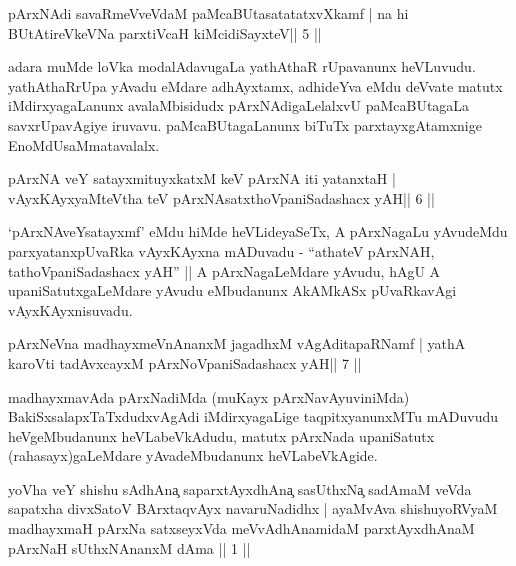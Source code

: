 \begin{shl}
pArxNAdi savaRmeVveVdaM paMcaBUtasatatatxvXkamf |
na hi BUtAtireVkeVNa parxtiVcaH kiMcidiSayxteV\hfill || 5 ||
\end{shl}

\begin{artha}
adara muMde loVka modalAdavugaLa yathAthaR rUpavanunx heVLuvudu. yathAthaRrUpa yAvadu eMdare adhAyxtamx, adhideYva eMdu deVvate matutx iMdirxyagaLanunx avalaMbisidudx pArxNAdigaLelalxvU paMcaBUtagaLa savxrUpavAgiye iruvavu. paMcaBUtagaLanunx biTuTx parxtayxgAtamxnige EnoMdU\break saMmatavalalx.
\end{artha}

\begin{shl}
pArxNA veY satayxmituyxkatxM keV pArxNA iti yatanxtaH |
vAyxKAyxyaMteV\s tha teV pArxNAsatxthoVpaniSadashacx yAH\hfill || 6 ||
\end{shl}

\begin{artha}
`pArxNAveYsatayxmf' eMdu hiMde heVLideyaSeTx, A pArxNagaLu yAvudeMdu parxyatanxpUvaRka vAyxKAyxna mADuvadu - ``athateV pArxNAH, tathoVpaniSadashacx yAH'' || A pArxNagaLeMdare yAvudu, hAgU A upaniSatutxgaLeMdare yAvudu eMbudanunx AkAMkASx pUvaRkavAgi vAyxKAyxnisuvadu.
\end{artha}



\begin{shl}
pArxNeVna madhayxmeVnAnanxM jagadhxM vAgAditapaRNamf |
yathA karoVti tadAvxcayxM pArxNoVpaniSadashacx yAH\hfill || 7 ||
\end{shl}

\begin{artha}
madhayxmavAda pArxNadiMda (muKayx pArxNavAyuviniMda) BakiSxsalapxTaTxdudx\break vAgAdi iMdirxyagaLige taqpitxyanunxMTu mADuvudu heVgeMbudanunx heVLabeVkAdudu, matutx pArxNada upaniSatutx (rahasayx)gaLeMdare yAvadeMbudanunx heVLabeVkAgide.
\end{artha}


\begin{kandikeshl}
yoVha veY shishu sAdhAna{\c} saparxtAyxdhAna{\c} sasUthxNa{\c} sadAmaM veVda sapatxha divxSatoV BArxtaqvAyx navaruNadidhx | ayaMvAva shishuyoRVyaM madhayxmaH pArxNa satxseyxVda meVvAdhAnamidaM parxtAyxdhAnaM pArxNaH sUthxNAnanxM dAma || 1 ||
\end{kandikeshl}

